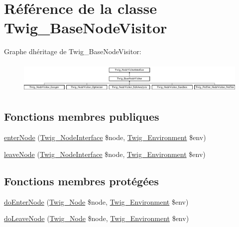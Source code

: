 \hypertarget{class_twig___base_node_visitor}{}\section{Référence de la classe Twig\+\_\+\+Base\+Node\+Visitor}
\label{class_twig___base_node_visitor}
Graphe d\textquotesingle{}héritage de Twig\+\_\+\+Base\+Node\+Visitor\+:\begin{figure}[H]
\begin{center}
\leavevmode
\includegraphics[height=1.548387cm]{class_twig___base_node_visitor}
\end{center}
\end{figure}
\subsection*{Fonctions membres publiques}
\begin{DoxyCompactItemize}
\item 
\hyperlink{class_twig___base_node_visitor_ad3bfee38f2bc56df9500da7f20b6e13a}{enter\+Node} (\hyperlink{interface_twig___node_interface}{Twig\+\_\+\+Node\+Interface} \$node, \hyperlink{class_twig___environment}{Twig\+\_\+\+Environment} \$env)
\item 
\hyperlink{class_twig___base_node_visitor_a436bb1ae16511148e860e5cfa2cad88f}{leave\+Node} (\hyperlink{interface_twig___node_interface}{Twig\+\_\+\+Node\+Interface} \$node, \hyperlink{class_twig___environment}{Twig\+\_\+\+Environment} \$env)
\end{DoxyCompactItemize}
\subsection*{Fonctions membres protégées}
\begin{DoxyCompactItemize}
\item 
\hyperlink{class_twig___base_node_visitor_a58d59325d3add0c1004f6a5cfb2562af}{do\+Enter\+Node} (\hyperlink{class_twig___node}{Twig\+\_\+\+Node} \$node, \hyperlink{class_twig___environment}{Twig\+\_\+\+Environment} \$env)
\item 
\hyperlink{class_twig___base_node_visitor_a7e9db0312cbd70344096235921930dd2}{do\+Leave\+Node} (\hyperlink{class_twig___node}{Twig\+\_\+\+Node} \$node, \hyperlink{class_twig___environment}{Twig\+\_\+\+Environment} \$env)
\end{DoxyCompactItemize}


